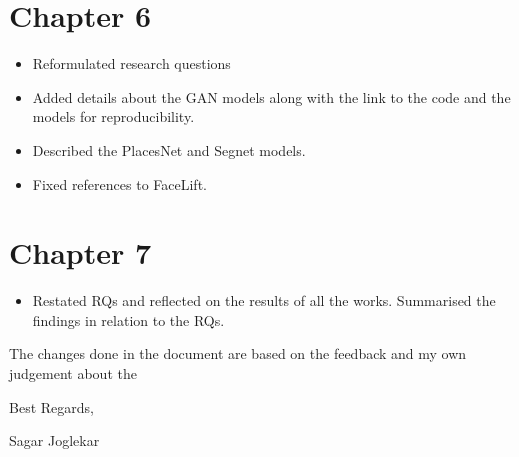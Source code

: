 \documentclass[11pt,a4paper,roman]{moderncv}
\begin{document}
\section{Chapter 6}

\begin{itemize}
    \item Reformulated research questions
    \item Added details about the GAN models along with the link to the code and the models for reproducibility. 
    \item Described the PlacesNet and Segnet models. 
    \item Fixed references to FaceLift. 
\end{itemize}

\section{Chapter 7}
\begin{itemize}
    \item Restated RQs and reflected on the results of all the works. Summarised the findings in relation to the RQs.
\end{itemize}

The changes done in the document are based on the feedback and my own judgement about the 

Best Regards,

Sagar Joglekar
\end{document}
